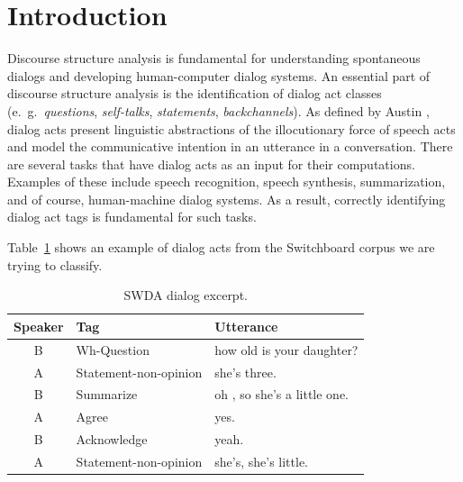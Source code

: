 \section{Introduction}\label{sec:intro}
Discourse structure analysis is fundamental for understanding spontaneous dialogs and developing human-computer dialog systems.
An essential part of discourse structure analysis is the identification of dialog act classes (e.\ g.\ \emph{questions}, \emph{self-talks}, \emph{statements}, \emph{backchannels}).
As defined by Austin , dialog acts present linguistic abstractions of the illocutionary force of speech acts and model the communicative intention in an utterance in a conversation. There are several tasks that have dialog acts as an input for their computations. Examples of these include speech recognition, speech synthesis, summarization, and of course, human-machine dialog systems. As a result, correctly identifying dialog act tags is fundamental for such tasks.


Table~\ref{tab:swda_example} shows an example of dialog acts from the Switchboard corpus we are trying to classify.



\begin{table}[h]
\centering
\begin{tabular}{c l l}
\hline
\textbf{Speaker} & \textbf{Tag} & \textbf{Utterance}
\\
\hline
B & Wh-Question & how old is your daughter?\\
A & Statement-non-opinion & she's three.\\
B & Summarize & oh , so she's a little one.\\
A & Agree & yes.\\
B & Acknowledge & yeah.\\
A & Statement-non-opinion & she's, she's little.\\
\hline
\end{tabular}
\caption{SWDA dialog excerpt.}
\label{tab:swda_example}
\end{table}

